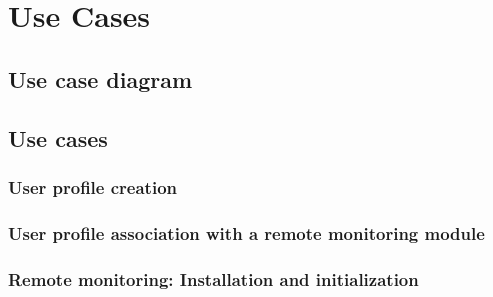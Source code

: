 \chapter{Use Cases}
\label{use-cases}

\section{Use case diagram}

\begin{figure}
	\begin{centering}
		\label{use-case-diagram}
	\end{centering}
\end{figure}

\section{Use cases}

\subsection{User profile creation}
\label{uc-user-profile-creation}


\subsection{User profile association with a remote monitoring module}
\label{uc-user-profile-association}


\subsection{Remote monitoring: Installation and initialization}
\label{uc-remote-monitoring-installation}


